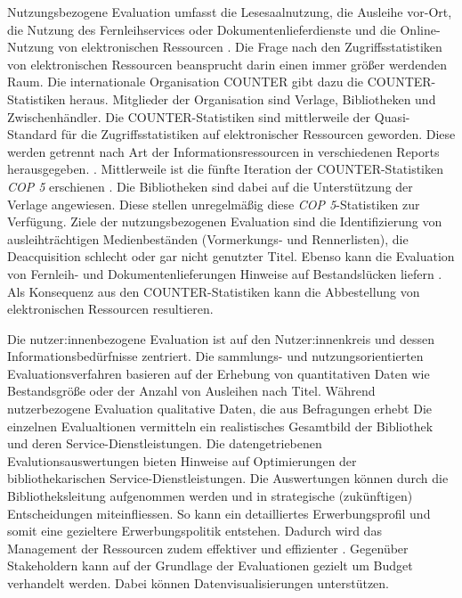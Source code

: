 Nutzungsbezogene Evaluation umfasst die Lesesaalnutzung, die Ausleihe vor-Ort, die Nutzung des Fernleihservices oder Dokumentenlieferdienste und die Online-Nutzung von elektronischen Ressourcen \cite[Vgl.][254 ff.]{johannsen_jochen_bestands-_2015}.
Die Frage nach den Zugriffsstatistiken von elektronischen Ressourcen beansprucht darin einen immer größer werdenden Raum.
Die internationale Organisation \acrfull{COUNTER} gibt dazu die COUNTER-Statistiken heraus. Mitglieder der Organisation sind Verlage, Bibliotheken
und Zwischenhändler. Die COUNTER-Statistiken sind mittlerweile der Quasi-Standard für die Zugriffsstatistiken 
auf elektronischer Ressourcen geworden. Diese werden getrennt nach Art der Informationsressourcen in verschiedenen Reports herausgegeben. \cite[Vgl.][260 ff.]{johannsen_jochen_bestands-_2015}. 
Mittlerweile ist die fünfte Iteration der COUNTER-Statistiken \textit{\acrshort{COP 5}} erschienen \cite{counter_abstract_2020}.
Die Bibliotheken sind dabei auf die Unterstützung der Verlage angewiesen. Diese stellen unregelmäßig diese \textit{\acrshort{COP 5}}-Statistiken zur
Verfügung. Ziele der nutzungsbezogenen Evaluation sind die Identifizierung von ausleihträchtigen Medienbeständen (Vormerkungs- und Rennerlisten), 
die Deacquisition schlecht oder gar nicht genutzter Titel. Ebenso kann die Evaluation von Fernleih- und Dokumentenlieferungen Hinweise auf Bestandslücken liefern
\cite[Vgl.][255 ff.]{johannsen_jochen_bestands-_2015}. Als Konsequenz aus den COUNTER-Statistiken kann die Abbestellung von elektronischen Ressourcen resultieren.

Die nutzer:innenbezogene Evaluation ist auf den Nutzer:innenkreis und dessen Informationsbedürfnisse zentriert. 
Die sammlungs- und nutzungsorientierten Evaluationsverfahren basieren auf der Erhebung von quantitativen Daten wie Bestandsgröße oder der Anzahl von Ausleihen nach Titel. 
Während nutzerbezogene Evaluation qualitative Daten, die aus Befragungen erhebt
Die einzelnen Evalualtionen vermitteln ein realistisches Gesamtbild der Bibliothek und deren Service-Dienstleistungen. 
Die datengetriebenen Evalutionsauswertungen bieten Hinweise auf Optimierungen der bibliothekarischen Service-Dienstleistungen. 
Die Auswertungen können durch die Bibliotheksleitung aufgenommen werden und in strategische (zukünftigen) Entscheidungen miteinfliessen. 
So kann ein detailliertes Erwerbungsprofil und somit eine gezieltere Erwerbungspolitik entstehen. 
Dadurch wird das Management der Ressourcen zudem effektiver und effizienter \cite[Vgl.][297]{johnson_peggy_fundamentals_2014}.
Gegenüber Stakeholdern kann auf der Grundlage der Evaluationen gezielt um Budget verhandelt werden. 
Dabei können Datenvisualisierungen unterstützen.

